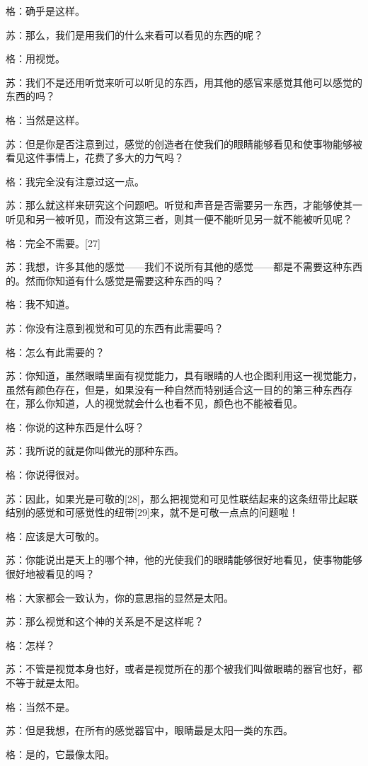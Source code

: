 \documentclass[12pt,oneside]{book}
\begin{document}
格：确乎是这样。

苏：那么，我们是用我们的什么来看可以看见的东西的呢？

格：用视觉。

苏：我们不是还用听觉来听可以听见的东西，用其他的感官来感觉其他可以感觉的东西的吗？

格：当然是这样。

苏：但是你是否注意到过，感觉的创造者在使我们的眼睛能够看见和使事物能够被看见这件事情上，花费了多大的力气吗？

格：我完全没有注意过这一点。

苏：那么就这样来研究这个问题吧。听觉和声音是否需要另一东西，才能够使其一听见和另一被听见，而没有这第三者，则其一便不能听见另一就不能被听见呢？

格：完全不需要。[27]

苏：我想，许多其他的感觉——我们不说所有其他的感觉——都是不需要这种东西的。然而你知道有什么感觉是需要这种东西的吗？

格：我不知道。

苏：你没有注意到视觉和可见的东西有此需要吗？

格：怎么有此需要的？

苏：你知道，虽然眼睛里面有视觉能力，具有眼睛的人也企图利用这一视觉能力，虽然有颜色存在，但是，如果没有一种自然而特别适合这一目的的第三种东西存在，那么你知道，人的视觉就会什么也看不见，颜色也不能被看见。

格：你说的这种东西是什么呀？

苏：我所说的就是你叫做光的那种东西。

格：你说得很对。

苏：因此，如果光是可敬的[28]，那么把视觉和可见性联结起来的这条纽带比起联结别的感觉和可感觉性的纽带[29]来，就不是可敬一点点的问题啦！

格：应该是大可敬的。

苏：你能说出是天上的哪个神，他的光使我们的眼睛能够很好地看见，使事物能够很好地被看见的吗？

格：大家都会一致认为，你的意思指的显然是太阳。

苏：那么视觉和这个神的关系是不是这样呢？

格：怎样？

苏：不管是视觉本身也好，或者是视觉所在的那个被我们叫做眼睛的器官也好，都不等于就是太阳。

格：当然不是。

苏：但是我想，在所有的感觉器官中，眼睛最是太阳一类的东西。

格：是的，它最像太阳。
\end{document}
